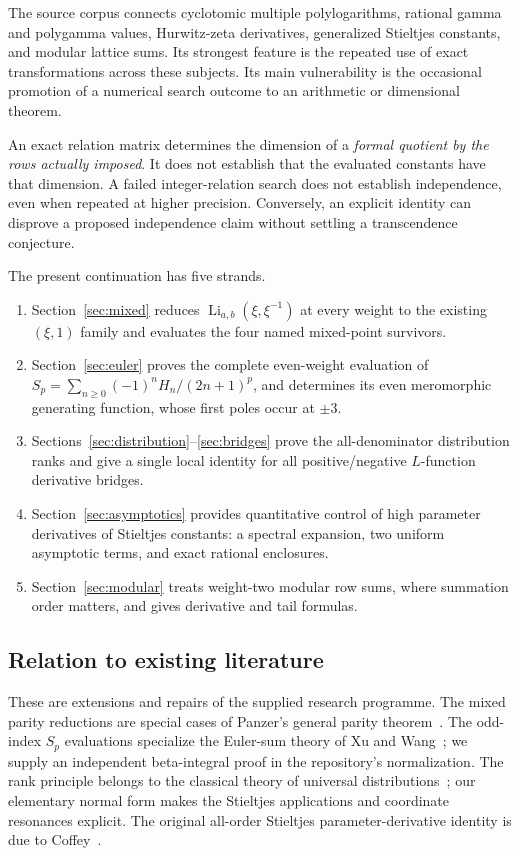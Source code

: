 \documentclass[11pt]{article}
\theoremstyle{definition}
\theoremstyle{remark}
\newcommand{\Li}{\operatorname{Li}}
\begin{document}
The source corpus connects cyclotomic multiple polylogarithms, rational
gamma and polygamma values, Hurwitz-zeta derivatives, generalized Stieltjes
constants, and modular lattice sums. Its strongest feature is the repeated
use of exact transformations across these subjects. Its main vulnerability
is the occasional promotion of a numerical search outcome to an
arithmetic or dimensional theorem.

An exact relation matrix determines the dimension of a \emph{formal
quotient by the rows actually imposed}. It does not establish that the
evaluated constants have that dimension. A failed integer-relation search
does not establish independence, even when repeated at higher precision.
Conversely, an explicit identity can disprove a proposed independence
claim without settling a transcendence conjecture.

The present continuation has five strands.
\begin{enumerate}
\item Section~\ref{sec:mixed} reduces
\(\Li_{a,b}(\xi,\xi^{-1})\) at every weight to the existing
\((\xi,1)\) family and evaluates the four named mixed-point survivors.
\item Section~\ref{sec:euler} proves the complete even-weight evaluation
of \(S_p=\sum_{n\ge0}(-1)^nH_n/(2n+1)^p\), and determines its even
meromorphic generating function, whose first poles occur at \(\pm3\).
\item Sections~\ref{sec:distribution}--\ref{sec:bridges} prove the
all-denominator distribution ranks and give a single local identity for
all positive/negative \(L\)-function derivative bridges.
\item Section~\ref{sec:asymptotics} provides quantitative control of high
parameter derivatives of Stieltjes constants: a spectral expansion,
two uniform asymptotic terms, and exact rational enclosures.
\item Section~\ref{sec:modular} treats weight-two modular row sums,
where summation order matters, and gives derivative and tail formulas.
\end{enumerate}

\subsection{Relation to existing literature}

These are extensions and repairs of the supplied research programme.
The mixed parity reductions are special cases of Panzer's general parity
theorem~\cite{Panzer}. The odd-index \(S_p\) evaluations specialize the
Euler-sum theory of Xu and Wang~\cite{XuWang}; we supply an independent
beta-integral proof in the repository's normalization. The rank principle
belongs to the classical theory of universal
distributions~\cite{Kubert,Ouyang}; our elementary normal form makes the
Stieltjes applications and coordinate resonances explicit. The original
all-order Stieltjes parameter-derivative identity is due to
Coffey~\cite{Coffey}.
\end{document}

